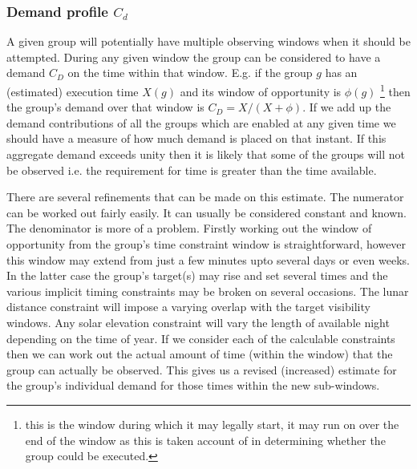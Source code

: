 \subsubsection{Demand profile $C_d$}
\label{sect:demand_profile}
 A given group will potentially have multiple observing windows when it should be attempted. During any given window the group can be considered to have a demand $C_D$ on the time within that window. E.g. if the group $g$ has an (estimated) execution time $X(g)$ and its window of opportunity is $\phi(g)$ \footnote[1]{this is the window during which it may legally start, it may run on over the end of the window as this is taken account of in determining whether the group could be executed.} then the group's demand over that window is $C_D=X/(X+\phi)$. If we add up the demand contributions of all the groups which are enabled at any given time we should have a measure of how much demand is placed on that instant. If this aggregate demand exceeds unity then it is likely that some of the groups will not be observed i.e. the requirement for time is greater than the time available. 

There are several refinements that can be made on this estimate. The numerator can be worked out fairly easily. It can usually be considered constant and known. The denominator is more of a problem. Firstly working out the window of opportunity from the group's time constraint window is straightforward, however this window may extend from just a few minutes upto several days or even weeks. In the latter case the group's target(s) may rise and set several times and the various implicit timing constraints may be broken on several occasions. The lunar distance constraint will impose a varying overlap with the target visibility windows. Any solar elevation constraint will vary the length of available night depending on the time of year. If we consider each of the calculable constraints then we can work out the actual amount of time (within the window) that the group can actually be observed. This gives us a revised (increased) estimate for the group's individual demand for those times within the new sub-windows. 

